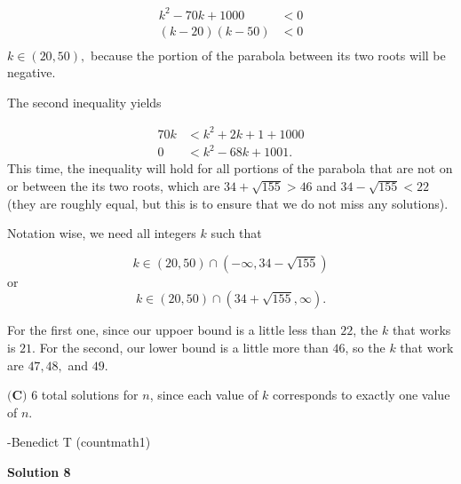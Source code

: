 \begin{enumerate}
 \begin{align*}k^2 - 70k + 1000 &< 0 \\(k-20)(k-50) &< 0\\\end{align*}
$k\in (20, 50),$ because the portion of the parabola between its two roots will be negative. 

 The second inequality yields 

 \begin{align*}70k &< k^2 + 2k + 1 + 1000 \\0 &< k^2 -68k + 1001.\end{align*}
This time, the inequality will hold for all portions of the parabola that are not on or between the its two roots, which are $34 + \sqrt{155}>46$ and $34-\sqrt{155}<22$ (they are roughly equal, but this is to ensure that we do not miss any solutions). 

 Notation wise, we need all integers $k$ such that 

 
 \[k \in \left(20, 50\right) \cap \left(-\infty,34 - \sqrt{155} \right)\]or 
 \[k \in \left(20, 50\right) \cap \left(34 + \sqrt{155}, \infty \right).\]

 For the first one, since our uppoer bound is a little less than $22$, the $k$ that works is $21$. For the second, our lower bound is a little more than $46$, so the $k$ that work are $47, 48,$ and  $49$. 

 $\boxed{\textbf{(C) }6}$ total solutions for $n$, since each value of $k$ corresponds to exactly one value of $n$. 

 -Benedict T (countmath1)

 



\textbf{Solution 8}


\end{enumerate}
